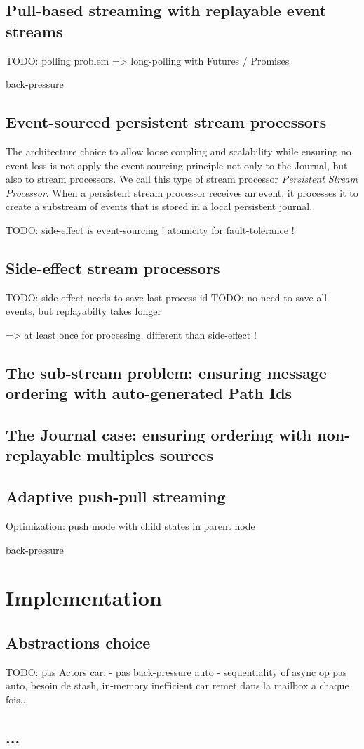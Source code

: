\subsection{Pull-based streaming with replayable event streams}

TODO: polling problem => long-polling with Futures / Promises

back-pressure

\subsection{Event-sourced persistent stream processors}

The architecture choice to allow loose coupling and scalability while ensuring no event loss is not apply the event sourcing principle not only to the Journal, but also to 
stream processors. We call this type of stream processor \textit{Persistent Stream Processor}. When a persistent stream processor receives an event, it processes it 
to create a substream of events that is stored in a local persistent journal.

TODO: side-effect is event-sourcing ! atomicity for fault-tolerance !

\subsection{Side-effect stream processors}

TODO: side-effect needs to save last process id
TODO: no need to save all events, but replayabilty takes longer

=> at least once for processing, different than side-effect !

\subsection{The sub-stream problem: ensuring message ordering with auto-generated Path Ids}


\subsection{The Journal case: ensuring ordering with non-replayable multiples sources}


\subsection{Adaptive push-pull streaming}

Optimization: push mode with child states in parent node

back-pressure


\section{Implementation}

\subsection{Abstractions choice}

TODO: pas Actors car:
- pas back-pressure auto
- sequentiality of async op pas auto, besoin de stash, in-memory inefficient car remet dans la mailbox a chaque fois...

\subsection{...}



